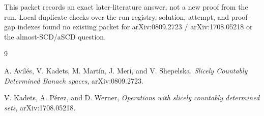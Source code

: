 \documentclass[11pt]{article}
\begin{document}
This packet records an exact later-literature answer, not a new proof from the
run. Local duplicate checks over the run registry, solution, attempt, and
proof-gap indexes found no existing packet for arXiv:0809.2723 /
arXiv:1708.05218 or the almost-SCD/aSCD question.

\begin{thebibliography}{9}

A. Avilés, V. Kadets, M. Martín, J. Merí, and V. Shepelska,
\emph{Slicely Countably Determined Banach spaces},
arXiv:0809.2723.

V. Kadets, A. Pérez, and D. Werner,
\emph{Operations with slicely countably determined sets},
arXiv:1708.05218.

\end{thebibliography}
\end{document}

